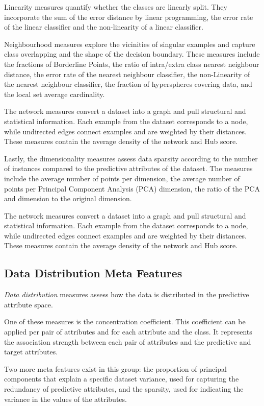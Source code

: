 Linearity measures quantify whether the classes are linearly split. They incorporate the sum of the error distance by linear programming, the error rate of the linear classifier and the non-linearity of a linear classifier.

Neighbourhood measures explore the vicinities of singular examples and capture class overlapping and the shape of the decision boundary. These measures include the fractions of Borderline Points, the ratio of intra/extra class nearest neighbour distance, the error rate of the nearest neighbour classifier, the non-Linearity of the nearest neighbour classifier, the fraction of hyperspheres covering data, and the local set average cardinality.

The network measures convert a dataset into a graph and pull structural and statistical information. Each example from the dataset corresponds to a node, while undirected edges connect examples and are weighted by their distances. These measures contain the average density of the network and Hub score.

Lastly, the dimensionality measures assess data sparsity according to the number of instances compared to the predictive attributes of the dataset. The measures include the average number of points per dimension, the average number of points per Principal Component Analysis (PCA) dimension, the ratio of the PCA and dimension to the original dimension.

The network measures convert a dataset into a graph and pull structural and statistical information. Each example from the dataset corresponds to a node, while undirected edges connect examples and are weighted by their distances. These measures contain the average density of the network and Hub score.

\subsection{Data Distribution Meta Features}
\textit{Data distribution} measures assess how the data is distributed in the predictive attribute space. 

One of these measures is the concentration coefficient. This coefficient can be applied per pair of attributes and for each attribute and the class. It represents the association strength between each pair of attributes and the predictive and target attributes.

Two more meta features exist in this group: the proportion of principal components that explain a specific dataset variance, used for capturing the redundancy of predictive attributes, and the sparsity, used for indicating the variance in the values of the attributes.

